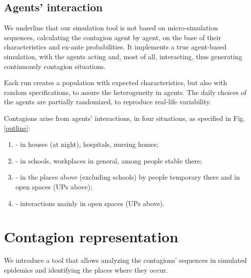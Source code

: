 \documentclass[graybox]{svmult}
\begin{document}
\subsection{Agents' interaction}
\label{inter}

We underline that our simulation tool is not based on micro-simulation sequences, calculating the contagion agent by agent, on the base of their characteristics and ex-ante probabilities. It implements a true agent-based simulation, with the agents acting and, most of all, interacting, thus generating continuously contagion situations.

Each run creates a population with expected characteristics, but also with random specifications, to assure the heterogeneity in agents. The daily choices of the agents are partially randomized, to reproduce real-life variability.

Contagions arise from agents' interactions, in four situations, as specified in Fig. \ref{outline}:

\begin{enumerate}[label=\Alph*]

\item - in houses (at night), hospitals, nursing homes;

\item - in schools, workplaces in general, among people stable there;

\item - in the places above (excluding schools) by people temporary there and in open spaces (UPs above);

\item - interactions mainly in open spaces (UPs above).

\end{enumerate}

\section{Contagion representation}
\label{contag}


We introduce a tool that allows analyzing the contagions' sequences in simulated epidemics and identifying the places where they occur.
\end{document}
